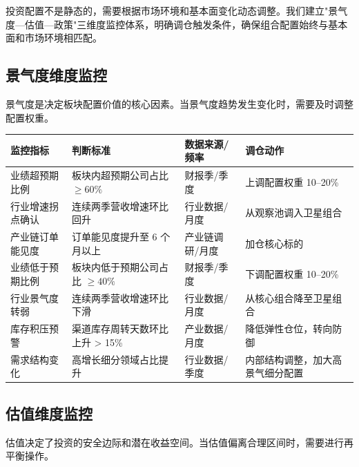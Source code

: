 投资配置不是静态的，需要根据市场环境和基本面变化动态调整。我们建立"景气度—估值—政策"三维度监控体系，明确调仓触发条件，确保组合配置始终与基本面和市场环境相匹配。

\subsection{景气度维度监控}

景气度是决定板块配置价值的核心因素。当景气度趋势发生变化时，需要及时调整配置权重。

\begin{exhibitbox}[表8-6：景气度维度监控指标与触发条件]
\centering
\footnotesize
\setlength{\tabcolsep}{3pt}
\setlength{\aboverulesep}{0pt}
\setlength{\belowrulesep}{0pt}
\begin{tabularx}{\linewidth}{L{2.6cm} L{3.4cm} L{2.4cm} X}
\toprule
\textbf{监控指标} & \textbf{判断标准} & \textbf{数据来源/频率} & \textbf{调仓动作} \\
\midrule
{}
业绩超预期比例 & 板块内超预期公司占比 $\geq 60\%$ & 财报季/季度 & 上调配置权重 10--20\% \\
行业增速拐点确认 & 连续两季营收增速环比回升 & 行业数据/月度 & 从观察池调入卫星组合 \\
产业链订单能见度 & 订单能见度提升至 6 个月以上 & 产业链调研/月度 & 加仓核心标的 \\
\midrule
{}
业绩低于预期比例 & 板块内低于预期公司占比 $\geq 40\%$ & 财报季/季度 & 下调配置权重 10--20\% \\
行业景气度转弱 & 连续两季营收增速环比下滑 & 行业数据/月度 & 从核心组合降至卫星组合 \\
库存积压预警 & 渠道库存周转天数环比上升 > 15\% & 产业数据/月度 & 降低弹性仓位，转向防御 \\
\midrule
{}
需求结构变化 & 高增长细分领域占比提升 & 行业数据/季度 & 内部结构调整，加大高景气细分配置 \\
\bottomrule
\end{tabularx}
\end{exhibitbox}

\subsection{估值维度监控}

估值决定了投资的安全边际和潜在收益空间。当估值偏离合理区间时，需要进行再平衡操作。

